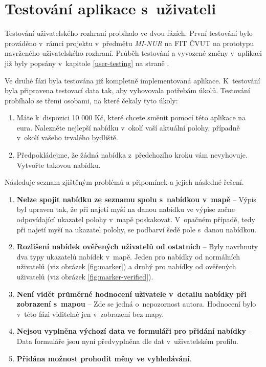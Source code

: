 \chapter{Testování aplikace s~uživateli}
\label{user-testing2}

Testování uživatelského rozhraní probíhalo ve dvou fázích. První testování bylo prováděno v~rámci projektu v~předmětu \textit{MI-NUR} na FIT ČVUT na prototypu navrženého uživatelského rozhraní. Průběh testování a vyvozené změny v~aplikaci již byly popsány v~kapitole \ref{user-testing} na straně \pageref{user-testing}.

Ve druhé fázi byla testována již kompletně implementovaná aplikace. K~testování byla připravena testovací data tak, aby vyhovovala potřebám úkolů. Testování probíhalo se třemi osobami, na které čekaly tyto úkoly:

\begin{enumerate}
    \item Máte k~dispozici 10 000 Kč, které chcete směnit pomocí této aplikace na eura. Nalezněte nejlepší nabídku v~okolí vaší aktuální polohy, případně v~okolí vašeho trvalého bydliště.
    \item Předpokládejme, že žádná nabídka z~předchozího kroku vám nevyhovuje. Vytvořte takovou nabídku.
\end{enumerate}

Následuje seznam zjištěným problémů a připomínek a jejich následné řešení.

\begin{enumerate}
    \item \textbf{Nelze spojit nabídku ze seznamu spolu s~nabídkou v~mapě} -- Výpis byl upraven tak, že při najetí myší na danou nabídku ve výpise začne odpovídající ukazatel polohy v~mapě poskakovat. V~opačném případě, tedy při najetí myší na ukazatel polohy, se podbarví šedě pole s~danou nabídkou.
    \item \textbf{Rozlišení nabídek ověřených uživatelů od ostatních} -- Byly navrhnuty dva typy ukazatelů nabídek v~mapě. Jeden pro nabídky od normálních uživatelů (viz obrázek \ref{fig:marker}) a druhý pro nabídky od ověřených uživatelů (viz obrázek \ref{fig:marker-verified}).
    \item \textbf{Není vidět průměrné hodnocení uživatele v~detailu nabídky při zobrazení s~mapou} -- Zde se jedná o~nepozornost autora. Hodnocení bylo v~této fázi viditelné jen v~zobrazení bez mapy.
    \item \textbf{Nejsou vyplněna výchozí data ve formuláři pro přidání nabídky} -- Data formuláře jsou nyní předvyplněna dle dat v~uživatelském profilu.
    \item \textbf{Přidána možnost prohodit měny ve vyhledávání}.
\end{enumerate}

